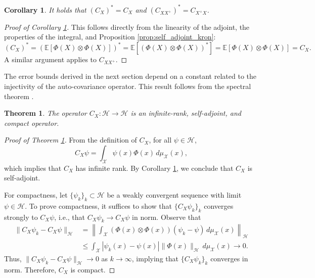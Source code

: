 \documentclass{article}
\newtheorem{theo}{Theorem}
\newtheorem{cor}{Corollary}
\renewcommand{\H}{\mathcal{H}}
\newcommand{\X}{\mathcal{X}}
\begin{document}
\begin{cor} \label{cor:adjoints_operator}
It holds that \( (C_{X})^* = C_X \) and \( (C_{XX^+})^* = C_{X^+X} \).
\end{cor}

\begin{proof}[Proof of Corollary \ref{cor:adjoints_operator}]
This follows directly from the linearity of the adjoint, the properties of the integral, and Proposition \ref{prop:self_adjoint_kron}:
\[
(C_X)^* = \left( \mathbb{E}[\Phi(X) \otimes \Phi(X)] \right)^* = \mathbb{E} \left[(\Phi(X) \otimes \Phi(X))^* \right] = \mathbb{E} [\Phi(X) \otimes \Phi(X)] = C_X.
\]
A similar argument applies to \( C_{XX^+} \).
\end{proof}

The error bounds derived in the next section depend on a constant related to the injectivity of the auto-covariance operator. This result follows from the spectral theorem \cite{Brezis2011FunctionalEquations}.

\begin{theo} \label{theo:CX_rank_selfad_compact}
The operator \( C_X: \H \to \H \) is an infinite-rank, self-adjoint, and compact operator.
\end{theo}

\begin{proof}[Proof of Theorem \ref{theo:CX_rank_selfad_compact}]
From the definition of \( C_X \), for all \( \psi \in \H \),
\[
C_X \psi = \int_\X \psi(x) \Phi(x) \, d\mu_\X(x),
\]
which implies that \( C_X \) has infinite rank. By Corollary \ref{cor:adjoints_operator}, we conclude that \( C_X \) is self-adjoint.

For compactness, let \( \{\psi_k\}_k \subset \H \) be a weakly convergent sequence with limit \( \psi \in \H \). To prove compactness, it suffices to show that \( \{C_X \psi_k\}_k \) converges strongly to \( C_X \psi \), i.e., that \( C_X \psi_k \to C_X \psi \) in norm. Observe that
\[
\begin{aligned}
    \| C_X \psi_k - C_X \psi \|_\H &= \left\| \int_\X (\Phi(x) \otimes \Phi(x)) (\psi_k - \psi) \, d\mu_\X(x) \right\|_\H \\ &\leq \int_\X | \psi_k (x) - \psi(x) | \|\Phi(x)\|_\H \, d\mu_\X(x)  \to 0.
\end{aligned}
\]
Thus, \( \| C_X \psi_k - C_X \psi \|_\H \to 0 \) as \( k \to \infty \), implying that \( \{C_X \psi_k\}_k \) converges in norm. Therefore, \( C_X \) is compact.
\end{proof}
\end{document}

